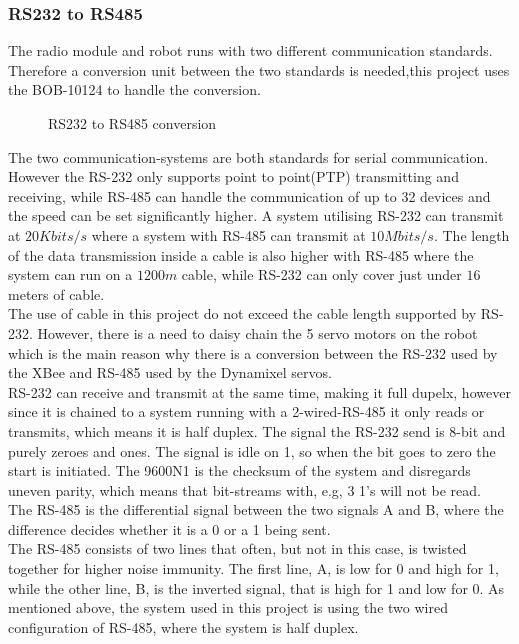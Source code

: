 \subsubsection*{RS232 to RS485} \label{sec:RS485}
The radio module and robot runs with two different communication standards. Therefore a conversion unit between the two standards is needed,this project uses the BOB-10124 to handle the conversion. 
\begin{figure}[H]
    \centering
    
    \caption{RS232 to RS485 conversion}
    \label{fig:RSPROTO}
\end{figure}
\noindent
The two communication-systems are both standards for serial communication. However the RS-232 only supports point to point(PTP) transmitting and receiving, while RS-485 can handle the communication of up to 32 devices and the speed can be set significantly higher. A system utilising RS-232 can transmit at $20 Kbits/s$ where a system with RS-485 can transmit at $10 Mbits/s$. The length of the data transmission inside a cable is also higher with RS-485 where the system can run on a $1200 m$ cable, while RS-232 can only cover just under $16$ meters of cable. \\
The use of cable in this project do not exceed the cable length supported by RS-232. However, there is a need to daisy chain the 5 servo motors on the robot which is the main reason why there is a conversion between the RS-232 used by the XBee and RS-485 used by the Dynamixel servos.\\

\noindent
RS-232 can receive and transmit at the same time, making it full dupelx, however since it is chained to a system running with a 2-wired-RS-485 it only reads or transmits, which means it is half duplex. The signal the RS-232 send is 8-bit and purely zeroes and ones. The signal is idle on 1, so when the bit goes to zero the start is initiated. The 9600N1 is the checksum of the system and disregards uneven parity, which means that bit-streams with, e.g, 3 1's will not be read. \\
\noindent
The RS-485 is the differential signal between the two signals A and B, where the difference decides whether it is a 0 or a 1 being sent.\\
The RS-485 consists of two lines that often, but not in this case, is twisted together for higher noise immunity. The first line, A, is low for 0 and high for 1, while the other line, B, is the inverted signal, that is high for 1 and low for 0. As mentioned above, the system used in this project is using the two wired configuration of RS-485, where the system is half duplex.  \cite{RS232/485:online}


